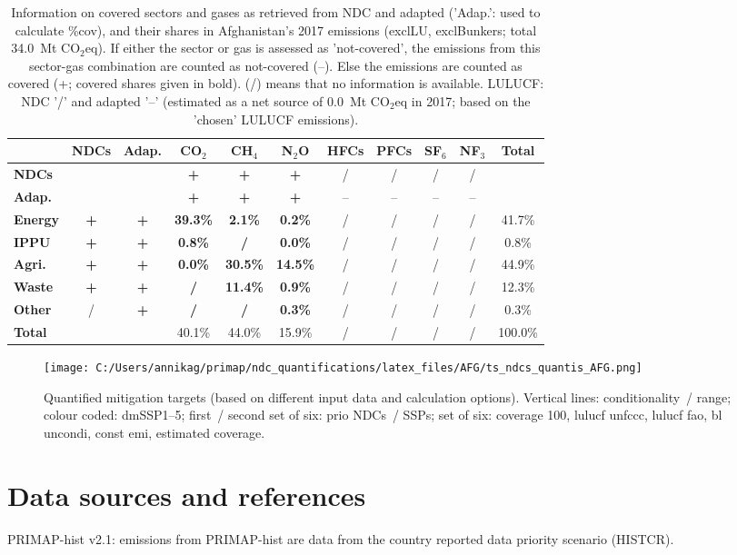 \documentclass[12pt]{article}
\begin{document}
 \begin{table}[htbp]\small
 \centering
 \caption{Information on covered sectors and gases as retrieved from NDC and adapted ('Adap.': used to calculate \%cov), and their shares in Afghanistan's 2017 emissions (exclLU, exclBunkers; total 34.0~Mt CO$_2$eq).
 If either the sector or gas is assessed as 'not-covered', the emissions from this sector-gas combination are counted as not-covered (--). 
 Else the emissions are counted as covered (+; covered shares given in bold).
 (/) means that no information is available.
 LULUCF: NDC '/' and adapted '--' (estimated as a net source of 0.0~Mt CO$_2$eq in 2017; based on the 'chosen' LULUCF emissions).}
 \label{tab:coveredSectorsGases}
 \begin{tabular}{l || c c || c c c c c c c | c}
 \bfseries  & \bfseries NDCs & \bfseries Adap. & \bfseries CO$_2$ & \bfseries CH$_4$ & \bfseries N$_2$O & \bfseries HFCs & \bfseries PFCs & \bfseries SF$_6$ & \bfseries NF$_3$ & \bfseries Total \tabularnewline \hline \hline
 \bfseries NDCs &  &  & \bfseries + & \bfseries + & \bfseries + & / & / & / & / &  \tabularnewline 
 \bfseries Adap. &  &  & \bfseries + & \bfseries + & \bfseries + & -- & -- & -- & -- &  \tabularnewline \hline \hline
 \bfseries Energy & \bfseries + & \bfseries + & \bfseries 39.3\% & \bfseries 2.1\% & \bfseries 0.2\% & / & / & / & / & 41.7\% \tabularnewline 
 \bfseries IPPU & \bfseries + & \bfseries + & \bfseries 0.8\% & \bfseries / & \bfseries 0.0\% & / & / & / & / & 0.8\% \tabularnewline 
 \bfseries Agri. & \bfseries + & \bfseries + & \bfseries 0.0\% & \bfseries 30.5\% & \bfseries 14.5\% & / & / & / & / & 44.9\% \tabularnewline 
 \bfseries Waste & \bfseries + & \bfseries + & \bfseries / & \bfseries 11.4\% & \bfseries 0.9\% & / & / & / & / & 12.3\% \tabularnewline 
 \bfseries Other & / & \bfseries + & \bfseries / & \bfseries / & \bfseries 0.3\% & / & / & / & / & 0.3\% \tabularnewline \hline
 \bfseries Total &  &  & 40.1\% & 44.0\% & 15.9\% & / & / & / & / & 100.0\% \tabularnewline 
 \end{tabular}
 \end{table}
 \begin{figure}[htbp]
 \centering
 \texttt{[image: C:/Users/annikag/primap/ndc\_quantifications/latex\_files/AFG/ts\_ndcs\_quantis\_AFG.png]}
 \caption{Quantified mitigation targets (based on different input data and calculation options).
 Vertical lines: conditionality~/ range;
 colour coded: dmSSP1--5;
 first~/ second set of six: prio NDCs~/ SSPs;
 set of six: coverage 100, lulucf unfccc, lulucf fao, bl uncondi, const emi, estimated coverage.}
 \label{fig:miti}
 \end{figure}

 \section{Data sources and references}
 \label{sec:dataSourcesRefs}
 PRIMAP-hist v2.1: emissions from PRIMAP-hist are data from the country reported data priority scenario (HISTCR).

 
\end{document}
